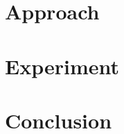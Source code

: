 \documentclass[10pt,twocolumn,letterpaper]{article}
\begin{document}
\section{Approach}


\section{Experiment}


%

\section{Conclusion}


{\small


}
\end{document}
